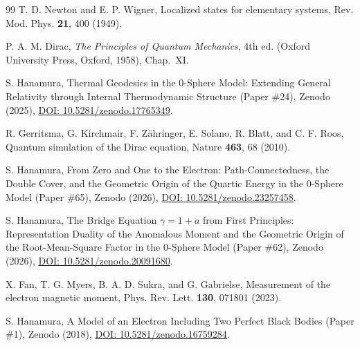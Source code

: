 \documentclass[%
 reprint, amsmath,amssymb, aps, prb, ]{revtex4-2}
\numberwithin{equation}{section}
\begin{document}
\begin{thebibliography}{99}
 T. D. Newton and E. P. Wigner, Localized states for elementary systems, Rev. Mod. Phys. \textbf{21}, 400 (1949).

 P. A. M. Dirac, \textit{The Principles of Quantum Mechanics}, 4th ed. (Oxford University Press, Oxford, 1958), Chap.~XI.

 S. Hanamura, Thermal Geodesics in the 0-Sphere Model: Extending General Relativity through Internal Thermodynamic Structure (Paper \#24), Zenodo (2025), \href{https://doi.org/10.5281/zenodo.17765349}{DOI: 10.5281/zenodo.17765349}.

 R. Gerritsma, G. Kirchmair, F. Z\"ahringer, E. Solano, R. Blatt, and C. F. Roos, Quantum simulation of the Dirac equation, Nature \textbf{463}, 68 (2010).

 S. Hanamura, From Zero and One to the Electron: Path-Connectedness, the Double Cover, and the Geometric Origin of the Quartic Energy in the 0-Sphere Model (Paper \#65), Zenodo (2026), \href{https://doi.org/10.5281/zenodo.23257458}{DOI: 10.5281/zenodo.23257458}.

 S. Hanamura, The Bridge Equation $\gamma = 1 + a$ from First Principles: Representation Duality of the Anomalous Moment and the Geometric Origin of the Root-Mean-Square Factor in the 0-Sphere Model (Paper \#62), Zenodo (2026), \href{https://doi.org/10.5281/zenodo.20091680}{DOI: 10.5281/zenodo.20091680}.

 X. Fan, T. G. Myers, B. A. D. Sukra, and G. Gabrielse, Measurement of the electron magnetic moment, Phys. Rev. Lett. \textbf{130}, 071801 (2023).

 S. Hanamura, A Model of an Electron Including Two Perfect Black Bodies (Paper \#1), Zenodo (2018), \href{https://doi.org/10.5281/zenodo.16759284}{DOI: 10.5281/zenodo.16759284}.

\end{thebibliography}

\end{document}
